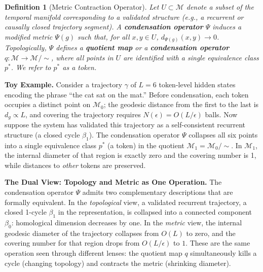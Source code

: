 \documentclass{article}
\newtheorem{definition}{Definition}
\begin{document}
\begin{definition}[Metric Contraction Operator]
\label{def:metric_contraction}
Let $U \subset \mathcal{M}$ denote a subset of the temporal manifold corresponding to a validated structure (e.g., a recurrent or causally closed trajectory segment).
A \textbf{condensation operator} $\Psi$ induces a modified metric $\Psi(g)$ such that, for all $x,y \in U$,
$d_{\Psi(g)}(x,y) \to 0$.
Topologically, $\Psi$ defines a \textbf{quotient map} or a \textbf{condensation operator}
$q : \mathcal{M} \rightarrow \mathcal{M}/\!\sim$,
where all points in $U$ are identified with a single equivalence class $p^\ast$.
We refer to $p^\ast$ as a \emph{token}.
\end{definition}
 
\noindent\textbf{Toy Example.}
Consider a trajectory $\gamma$ of $L=6$ token-level hidden states encoding the phrase ``the cat sat on the mat.'' Before condensation, each token occupies a distinct point on $\mathcal{M}_0$; the geodesic distance from the first to the last is $d_g \propto L$, and covering the trajectory requires $N(\epsilon) = O(L/\epsilon)$ balls. Now suppose the system has validated this trajectory as a self-consistent recurrent structure (a closed cycle $\beta_1$). The condensation operator $\Psi$ collapses all six points into a single equivalence class $p^\ast$ (a token) in the quotient $\mathcal{M}_1 = \mathcal{M}_0/{\sim}$. In $\mathcal{M}_1$, the internal diameter of that region is exactly zero and the covering number is 1, while distances to \emph{other} tokens are preserved. %
 
\noindent\textbf{The Dual View: Topology and Metric as One Operation.}
The condensation operator $\Psi$ admits two complementary descriptions that are formally equivalent. In the \emph{topological} view, a validated recurrent trajectory, a closed 1-cycle $\beta_1$ in the representation, is collapsed into a connected component $\beta_0$: homological dimension decreases by one. In the \emph{metric} view, the internal geodesic diameter of the trajectory collapses from $O(L)$ to zero, and the covering number for that region drops from $O(L/\epsilon)$ to $1$. These are the same operation seen through different lenses: the quotient map $q$ simultaneously kills a cycle (changing topology) and contracts the metric (shrinking diameter). %
 
\end{document}
